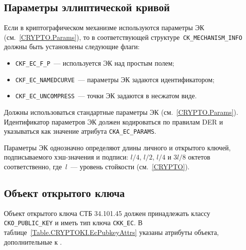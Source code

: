 




\subsection{Параметры эллиптической кривой}\label{CRYPTOKI.Params}

Если в криптографическом механизме используются параметры ЭК
(см.~\ref{CRYPTO.Params}), то в соответствующей
структуре~\verb|CK_MECHANISM_INFO| должны быть установлены 
следующие флаги: 
\begin{itemize}
\item
\verb|CKF_EC_F_P|~--- используется ЭК над простым полем;
\item
\verb|CKF_EC_NAMEDCURVE|~--- параметры ЭК задаются идентификатором;
\item
\verb|CKF_EC_UNCOMPRESS|~--- точки ЭК задаются в несжатом виде.
\end{itemize}

Должны использоваться стандартные параметры ЭК
(см.~\ref{CRYPTO.Params}).
Идентификатор параметров ЭК должен кодироваться по правилам
DER и указываться как значение атрибута \verb|CKA_EC_PARAMS|.

Параметры ЭК однозначно определяют длины личного и открытого ключей, 
подписываемого хэш-значения и подписи: $l/4$, $l/2$, $l/4$ и $3l/8$ 
октетов соответственно, где~$l$~--- уровень стойкости (см.~\ref{CRYPTO}). 

\subsection{Объект открытого ключа}\label{CRYPTOKI.Pubkey}


Объект открытого ключа СТБ 34.101.45 должен принадлежать
классу \verb|CKO_PUBLIC_KEY| и иметь тип ключа \verb|CKK_EC|.
%
В таблице~\ref{Table.CRYPTOKI.EcPubkeyAttrs} указаны 
атрибуты объекта, дополнительные к .

